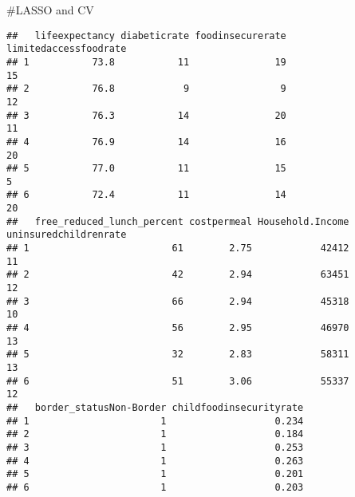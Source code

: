 \documentclass[]{article}
\newenvironment{Shaded}{\begin{snugshade}}{\end{snugshade}}
\newcommand{\DataTypeTok}[1]{\textcolor[rgb]{0.13,0.29,0.53}{#1}}
\newcommand{\DecValTok}[1]{\textcolor[rgb]{0.00,0.00,0.81}{#1}}
\newcommand{\FloatTok}[1]{\textcolor[rgb]{0.00,0.00,0.81}{#1}}
\newcommand{\KeywordTok}[1]{\textcolor[rgb]{0.13,0.29,0.53}{\textbf{#1}}}
\newcommand{\NormalTok}[1]{#1}
\newcommand{\OperatorTok}[1]{\textcolor[rgb]{0.81,0.36,0.00}{\textbf{#1}}}
\newcommand{\StringTok}[1]{\textcolor[rgb]{0.31,0.60,0.02}{#1}}
\begin{document}
\#LASSO and CV

\begin{Shaded}
\end{Shaded}

\begin{verbatim}
##   lifeexpectancy diabeticrate foodinsecurerate limitedaccessfoodrate
## 1           73.8           11               19                    15
## 2           76.8            9                9                    12
## 3           76.3           14               20                    11
## 4           76.9           14               16                    20
## 5           77.0           11               15                     5
## 6           72.4           11               14                    20
##   free_reduced_lunch_percent costpermeal Household.Income uninsuredchildrenrate
## 1                         61        2.75            42412                    11
## 2                         42        2.94            63451                    12
## 3                         66        2.94            45318                    10
## 4                         56        2.95            46970                    13
## 5                         32        2.83            58311                    13
## 6                         51        3.06            55337                    12
##   border_statusNon-Border childfoodinsecurityrate
## 1                       1                   0.234
## 2                       1                   0.184
## 3                       1                   0.253
## 4                       1                   0.263
## 5                       1                   0.201
## 6                       1                   0.203
\end{verbatim}

\begin{Shaded}
\end{Shaded}
\end{document}
